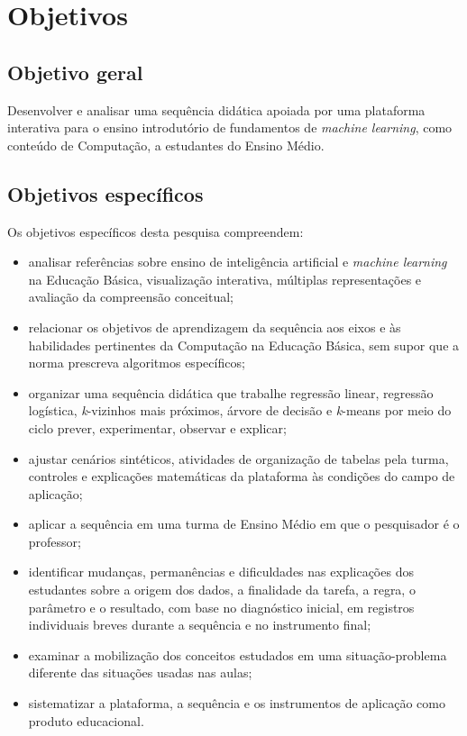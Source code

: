 \chapter{Objetivos}

\section{Objetivo geral}

Desenvolver e analisar uma sequência didática apoiada por uma plataforma interativa para o ensino introdutório de fundamentos de \textit{machine learning}, como conteúdo de Computação, a estudantes do Ensino Médio.

\section{Objetivos específicos}

Os objetivos específicos desta pesquisa compreendem:

\begin{itemize}
    \item analisar referências sobre ensino de inteligência artificial e \textit{machine learning} na Educação Básica, visualização interativa, múltiplas representações e avaliação da compreensão conceitual;
    \item relacionar os objetivos de aprendizagem da sequência aos eixos e às habilidades pertinentes da Computação na Educação Básica, sem supor que a norma prescreva algoritmos específicos;
    \item organizar uma sequência didática que trabalhe regressão linear, regressão logística, \textit{k}-vizinhos mais próximos, árvore de decisão e \textit{k}-means por meio do ciclo prever, experimentar, observar e explicar;
    \item ajustar cenários sintéticos, atividades de organização de tabelas pela turma, controles e explicações matemáticas da plataforma às condições do campo de aplicação;
    \item aplicar a sequência em uma turma de Ensino Médio em que o pesquisador é o professor;
    \item identificar mudanças, permanências e dificuldades nas explicações dos estudantes sobre a origem dos dados, a finalidade da tarefa, a regra, o parâmetro e o resultado, com base no diagnóstico inicial, em registros individuais breves durante a sequência e no instrumento final;
    \item examinar a mobilização dos conceitos estudados em uma situação-problema diferente das situações usadas nas aulas;
    \item sistematizar a plataforma, a sequência e os instrumentos de aplicação como produto educacional.
\end{itemize}
